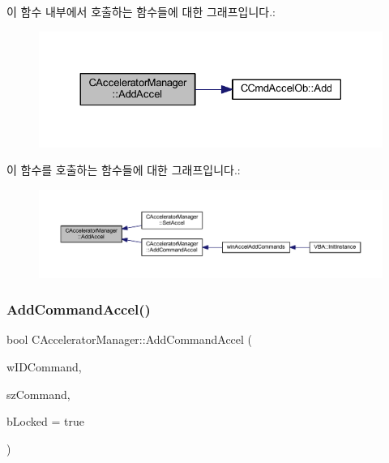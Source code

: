 이 함수 내부에서 호출하는 함수들에 대한 그래프입니다.\+:
\nopagebreak
\begin{figure}[H]
\begin{center}
\leavevmode
\includegraphics[width=330pt]{class_c_accelerator_manager_ac9e0e988625c9687666a9f582f9b3536_cgraph}
\end{center}
\end{figure}
이 함수를 호출하는 함수들에 대한 그래프입니다.\+:
\nopagebreak
\begin{figure}[H]
\begin{center}
\leavevmode
\includegraphics[width=350pt]{class_c_accelerator_manager_ac9e0e988625c9687666a9f582f9b3536_icgraph}
\end{center}
\end{figure}
\mbox{\label{class_c_accelerator_manager_a05227e733c2c5d4a4d8074bf28a4f333}} 
\subsubsection{\texorpdfstring{Add\+Command\+Accel()}{AddCommandAccel()}}
{\footnotesize\ttfamily bool C\+Accelerator\+Manager\+::\+Add\+Command\+Accel (\begin{DoxyParamCaption}\item[{W\+O\+RD}]{w\+I\+D\+Command,  }\item[{L\+P\+C\+T\+S\+TR}]{sz\+Command,  }\item[{bool}]{b\+Locked = {\ttfamily true} }\end{DoxyParamCaption})}



